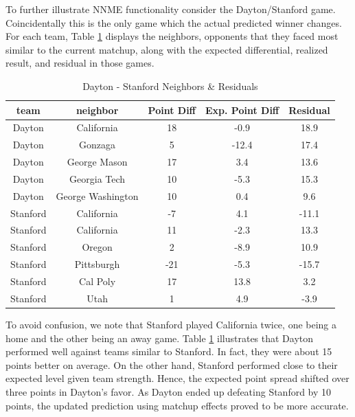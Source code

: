 \documentclass[letterpaper,12pt]{article}
\begin{document}
To further illustrate NNME functionality consider the Dayton/Stanford game.  Coincidentally this is the only game which the actual predicted winner changes. For each team, Table \ref{tab:DayStan} displays the neighbors, opponents that they faced most similar to the current matchup, along with the expected differential, realized result, and residual in those games. 
\begin{table}[h!]
\caption{Dayton - Stanford Neighbors \& Residuals}
\small
\centering
\begin{tabular}{|c|cccc |}
   \hline
   \hline
 team & neighbor &  Point Diff& Exp. Point Diff & Residual \\
  \hline
Dayton & California & 18 & -0.9 & 18.9\\
Dayton & Gonzaga & 5 & -12.4 & 17.4\\
Dayton & George Mason& 17 & 3.4 & 13.6\\
Dayton &  Georgia Tech& 10 & -5.3 & 15.3\\
Dayton & George Washington& 10 & 0.4 & 9.6\\
\hline
Stanford & California&-7 & 4.1&-11.1 \\
Stanford & California &11 &-2.3 &13.3 \\
Stanford & Oregon&2 &-8.9 &10.9 \\
Stanford & Pittsburgh&-21 &-5.3 &-15.7 \\
Stanford & Cal Poly&17 &13.8 &3.2 \\
Stanford & Utah&1 &4.9 &-3.9 \\
   \hline
   \hline
\end{tabular}
\label{tab:DayStan}
\end{table}
To avoid confusion, we note that Stanford played California twice, one being a home and the other being an away game.  Table \ref{tab:DayStan} illustrates that Dayton performed well against teams similar to Stanford. In fact, they were about 15 points better on average. On the other hand, Stanford performed close to their expected level given team strength. Hence, the expected point spread shifted over three points in Dayton's favor. As Dayton ended up defeating Stanford by 10 points, the updated prediction using matchup effects proved to be more accurate.
\end{document}
